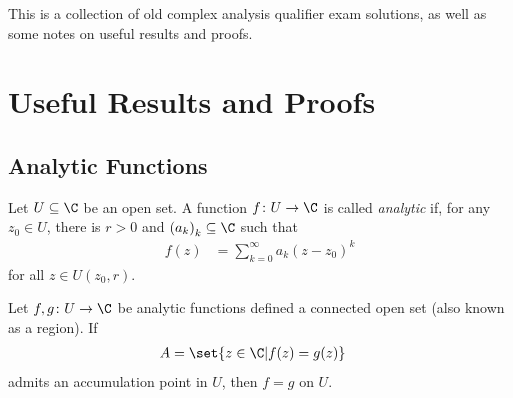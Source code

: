 \documentclass[10pt]{mypackage}
\begin{document}
\RaggedRight
This is a collection of old complex analysis qualifier exam solutions, as well as some notes on useful results and proofs.
\section{Useful Results and Proofs}%
\subsection{Analytic Functions}%
\begin{definition}
  Let $U\subseteq \C$ be an open set. A function $f\colon U\rightarrow \C$ is called \textit{analytic} if, for any $z_0\in U$, there is $r > 0$ and $\left( a_k \right)_k\subseteq \C$ such that
  \begin{align*}
    f(z) &= \sum_{k=0}^{\infty}a_k\left( z-z_0 \right)^{k}
  \end{align*}
  for all $z\in U\left( z_0,r \right)$.
\end{definition}
\begin{theorem}
  Let $f,g\colon U\rightarrow \C$ be analytic functions defined a connected open set (also known as a region). If
  \begin{align*}
    A &= \set{z\in \C | f(z) = g(z)}
  \end{align*}
  admits an accumulation point in $U$, then $f = g$ on $U$.
\end{theorem}
\end{document}

